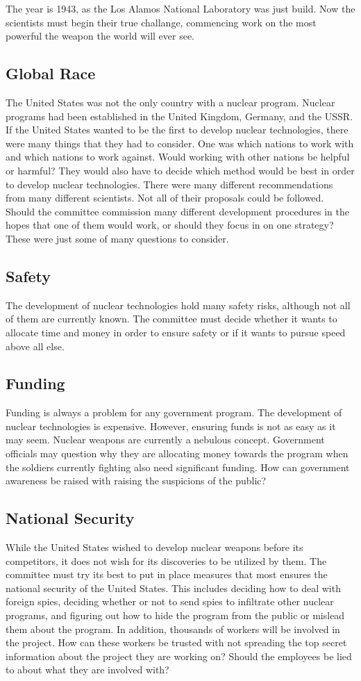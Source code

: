 \documentclass[11 pt, twoside]{article}
\begin{document}
The year is 1943, as the Los Alamos National Laboratory was just build. Now the scientists must begin their true challange, commencing work on the most powerful the weapon the world will ever see.
\subsection{Global Race}
	The United States was not the only country with a nuclear program. Nuclear programs had been established in the United Kingdom, Germany, and the USSR. If the United States wanted to be the first to develop nuclear technologies, there were many things that they had to consider. One was which nations to work with and which nations to work against. Would working with other nations be helpful or harmful? They would also have to decide which method would be best in order to develop nuclear technologies. There were many different recommendations from many different scientists. Not all of their proposals could be followed. Should the committee commission many different development procedures in the hopes that one of them would work, or should they focus in on one strategy? These were just some of many questions to consider. 

\subsection{Safety}
The development of nuclear technologies hold many safety risks, although not all of them are currently known. The committee must decide whether it wants to allocate time and money in order to ensure safety or if it wants to pursue speed above all else.

\subsection{Funding}
Funding is always a problem for any government program. The development of nuclear technologies is expensive. However, ensuring funds is not as easy as it may seem. Nuclear weapons are currently a nebulous concept. Government officials may question why they are allocating money towards the program when the soldiers currently fighting also need significant funding. How can government awareness be raised with raising the suspicions of the public? 

\subsection{National Security}
While the United States wished to develop nuclear weapons before its competitors, it does not wish for its discoveries to be utilized by them. The committee must try its best to put in place measures that most ensures the national security of the United States. This includes deciding how to deal with foreign spies, deciding  whether or not to send spies to infiltrate other nuclear programs, and figuring out how to hide the program from the public or mislead them about the program. In addition, thousands of workers will be involved in the project. How can these workers be trusted with not spreading the top secret information about the project they are working on? Should the employees be lied to about what they are involved with?
\end{document}
